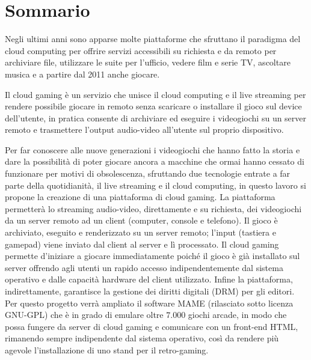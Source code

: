 %
%

\chapter*{Sommario}

Negli ultimi anni sono apparse molte piattaforme che sfruttano il paradigma del cloud computing per offrire servizi accessibili su richiesta e da remoto per archiviare file, utilizzare le suite per l'ufficio, vedere film e serie TV, ascoltare musica e a partire dal 2011 anche giocare.

Il cloud gaming è un servizio che unisce il cloud computing e il live streaming per rendere possibile giocare in remoto senza scaricare o installare il gioco sul device dell'utente, in pratica consente di archiviare ed eseguire i videogiochi su un server remoto e trasmettere l'output audio-video all'utente sul proprio dispositivo.

Per far conoscere alle nuove generazioni i videogiochi che hanno fatto la storia e dare la possibilità di poter giocare ancora a macchine che ormai hanno cessato di funzionare per motivi di obsolescenza, sfruttando due tecnologie entrate a far parte della quotidianità, il live streaming e il cloud computing, in questo lavoro si propone la creazione di una piattaforma di cloud gaming. La piattaforma permetterà lo streaming audio-video, direttamente e su richiesta, dei videogiochi da un server remoto ad un client (computer, console e telefono). Il gioco è archiviato, eseguito e renderizzato su un server remoto; l'input (tastiera e gamepad) viene inviato dal client al server e lì processato. Il cloud gaming permette d'iniziare a giocare immediatamente poiché il gioco è già installato sul server offrendo agli utenti un rapido accesso indipendentemente dal sistema operativo e dalle capacità hardware del client utilizzato. Infine la piattaforma, indirettamente, garantisce la gestione dei diritti digitali (DRM) per gli editori. Per questo progetto verrà ampliato il software MAME (rilasciato sotto licenza GNU-GPL) che è in grado di emulare oltre $7.000$ giochi arcade, in modo che possa fungere da server di cloud gaming e comunicare con un front-end HTML, rimanendo sempre indipendente dal sistema operativo, così da rendere più agevole l'installazione di uno stand per il retro-gaming.